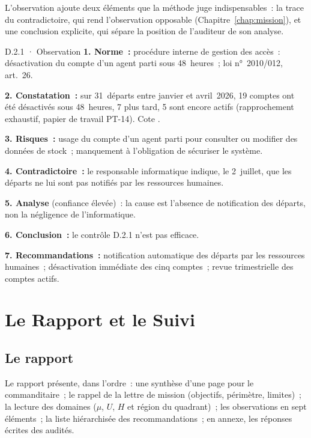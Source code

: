 L'observation ajoute deux éléments que la méthode juge indispensables~: la
trace du contradictoire, qui rend l'observation opposable
(Chapitre~\ref{chap:mission}), et une conclusion explicite, qui sépare la
position de l'auditeur de son analyse.

\begin{boxobjet}{D.2.1 · Observation}
\textbf{1. Norme~:} procédure interne de gestion des accès~: désactivation
du compte d'un agent parti sous 48~heures~; loi n°~2010/012, art.~26.

\textbf{2. Constatation~:} sur 31~départs entre janvier et avril~2026, 19
comptes ont été désactivés sous 48~heures, 7 plus tard, 5 sont encore
actifs (rapprochement exhaustif, papier de travail PT-14). Cote \NON{}.

\textbf{3. Risques~:} usage du compte d'un agent parti pour consulter ou
modifier des données de stock~; manquement à l'obligation de sécuriser le
système.

\textbf{4. Contradictoire~:} le responsable informatique indique, le
2~juillet, que les départs ne lui sont pas notifiés par les ressources
humaines.

\textbf{5. Analyse} (confiance élevée)~: la cause est l'absence de
notification des départs, non la négligence de l'informatique.

\textbf{6. Conclusion~:} le contrôle D.2.1 n'est pas efficace.

\textbf{7. Recommandations~:} notification automatique des départs par les
ressources humaines~; désactivation immédiate des cinq comptes~; revue
trimestrielle des comptes actifs.
\end{boxobjet}

\section{Le Rapport et le Suivi}
\label{sec:c09-rapport}

\subsection{Le rapport}

Le rapport présente, dans l'ordre~: une synthèse d'une page pour le
commanditaire~; le rappel de la lettre de mission (objectifs, périmètre,
limites)~; la lecture des domaines ($\mu$, $U$, $H$ et région du
quadrant)~; les observations en sept éléments~; la liste hiérarchisée des
recommandations~; en annexe, les réponses écrites des audités.

